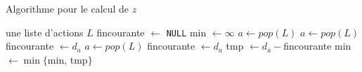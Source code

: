 \documentclass[a4paper,9pt]{report}
\begin{document}
\begin{algorithm}
    \caption{Algorithme pour le calcul de $z$}
    \label{algo_calcul_z}
    \begin{algorithmic}[1]
        \Require une liste d'actions $L$
        \State fincourante $\gets$ \texttt{NULL} 
        \State min $\gets \infty$
        \State $a \gets pop(L)$
            \State $a \gets pop(L)$
        \EndWhile
        \State fincourante $\gets d_a$
        \State $a \gets pop(L)$
                \State fincourante $\gets d_a$
            \Else
                \State tmp $\gets d_a - $fincourante
                    \State min $\gets \min\{$min, tmp$\}$
                \EndIf
            \EndIf
        \EndWhile
    \end{algorithmic}
\end{algorithm}
                


\end{document}
